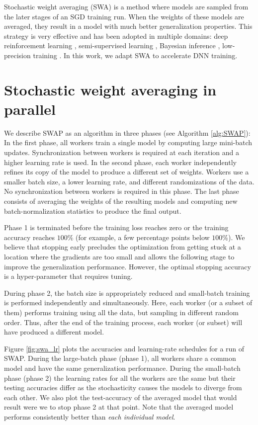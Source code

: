 \documentclass{article} %
\begin{document}
Stochastic weight averaging (SWA) \citep{swa} is a method where models are
sampled from the later stages of an SGD training run. When the weights of these
models are averaged, they result in a model with much better generalization
properties.  This strategy is very effective and has been adopted in multiple
domains: deep reinforcement learning \citep{swa_rl}, semi-supervised learning
\citep{swa_semiML}, Bayesian inference \citep{swa_bayesian}, low-precision
training \citep{swa_lp}.  In this work, we adapt SWA to accelerate DNN training.


\section{Stochastic weight averaging in parallel}
\vspace{-0.1in}

We describe SWAP as an algorithm in three phases (see Algorithm
\ref{alg:SWAP}): In the first phase, all workers train a single
model by computing large mini-batch updates. Synchronization between workers is
required at each iteration and a higher learning rate is used. In the second
phase, each worker independently refines its copy of the model to produce a
different set of weights. Workers use a smaller batch size, a lower learning
rate, and different randomizations of the data. No synchronization
between workers is required in this phase. The last phase consists of averaging the weights
of the resulting models and computing new batch-normalization statistics to
produce the final output.

Phase 1 is terminated before the training loss reaches zero or the training accuracy
reaches $100\%$ (for example, a few percentage points below $100\%$). We believe that
stopping early precludes the optimization from getting stuck at a location
where the gradients are too small and allows the following stage to improve the
generalization performance. However, the optimal stopping accuracy is a
hyper-parameter that requires tuning. 

During phase 2, the batch size is appropriately reduced and small-batch
training is performed independently and simultaneously. Here, each worker (or a subset of them)
performs training using all the data, but sampling in different
random order. Thus, after the end of the training process, each worker (or subset) will have produced 
a different model.

Figure \ref{fig:swa_lr} plots the accuracies and learning-rate schedules for a 
run of SWAP. During the large-batch phase (phase 1), all workers share a common
model and have the same generalization performance. During the small-batch phase
(phase 2) the learning rates for all the workers are the same but their testing
accuracies differ as the stochasticity causes the models to diverge from each
other. We also plot the test-accuracy of the averaged model that would result
were we to stop phase 2 at that point. Note that the averaged model performs
consistently better than \emph{each individual model}.
\end{document}
